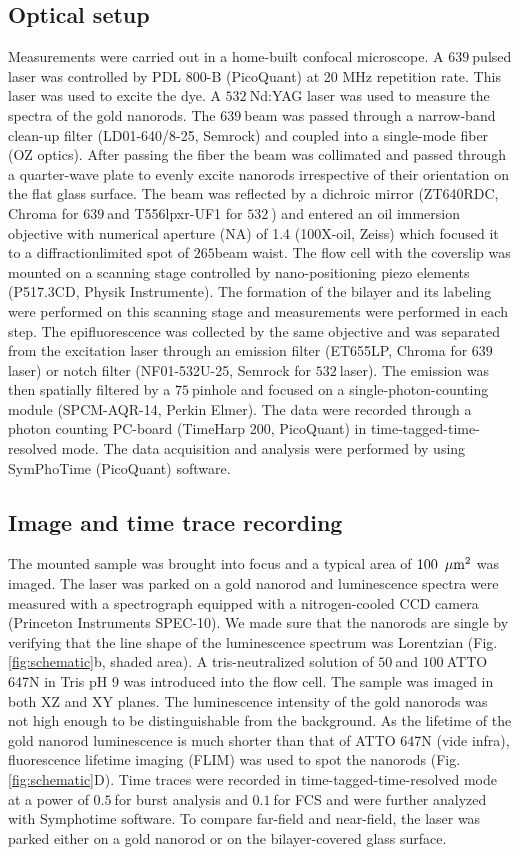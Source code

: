 \subsection{Optical setup}
Measurements were carried out in a home-built confocal microscope. A $639~$\nm pulsed laser was controlled by PDL 800-B (PicoQuant) at 20 MHz repetition rate. This laser was used to excite the dye. A $532~$\nm Nd:YAG laser was used to measure the spectra of the gold nanorods. The $639~$\nm beam was passed through a narrow-band clean-up filter (LD01-640/8-25, Semrock) and coupled into a single-mode fiber (OZ optics). After passing the fiber the beam was collimated and passed through a quarter-wave plate to evenly excite nanorods irrespective of their orientation on the flat glass surface. The beam was reflected by a dichroic mirror (ZT640RDC, Chroma for $639~$\nm and T556lpxr-UF1 for $532~$\nm) and entered an oil immersion objective with numerical aperture (NA) of 1.4 (100X-oil, Zeiss) which focused it to a diffractionlimited spot of $265$\nm beam waist. The flow cell with the coverslip was mounted on a scanning stage controlled by nano-positioning piezo elements (P517.3CD, Physik Instrumente). The formation of the bilayer and its labeling were performed on this scanning stage and measurements were performed in each step. The epifluorescence was collected by the same objective and was separated from the excitation laser through an emission filter (ET655LP, Chroma for $639~$\nm laser) or notch filter (NF01-532U-25, Semrock for $532~$\nm laser). The emission was then spatially filtered by a $75~$\um pinhole and focused on a single-photon-counting module (SPCM-AQR-14, Perkin Elmer). The data were recorded through a photon counting PC-board (TimeHarp 200, PicoQuant) in time-tagged-time-resolved mode. The data acquisition and analysis were performed by using SymPhoTime (PicoQuant) software.
\subsection{Image and time trace recording}
The mounted sample was brought into focus and a typical area of $100~\,\mu\textrm{m}^2$ was imaged. The laser was parked on a gold nanorod and luminescence spectra were measured with a spectrograph equipped with a nitrogen-cooled CCD camera (Princeton Instruments SPEC-10). We made sure that the nanorods are single by verifying that the line shape of the luminescence spectrum was Lorentzian (Fig. \ref{fig:schematic}b, shaded area). A tris-neutralized solution of $50~$\pM and $100~$\nM ATTO 647N in Tris pH 9 was introduced into the flow cell. The sample was imaged in both XZ and XY planes. The luminescence intensity of the gold nanorods was not high enough to be distinguishable from the background. As the lifetime of the gold nanorod luminescence is much shorter than that of ATTO 647N (vide infra), fluorescence lifetime imaging (FLIM) was used to spot the nanorods (Fig. \ref{fig:schematic}D). Time traces were recorded in time-tagged-time-resolved mode at a power of $0.5~$\uW for burst analysis and $0.1~$\uW for FCS and were further analyzed with Symphotime software. To compare far-field and near-field, the laser was parked either on a gold nanorod or on the bilayer-covered glass surface.
